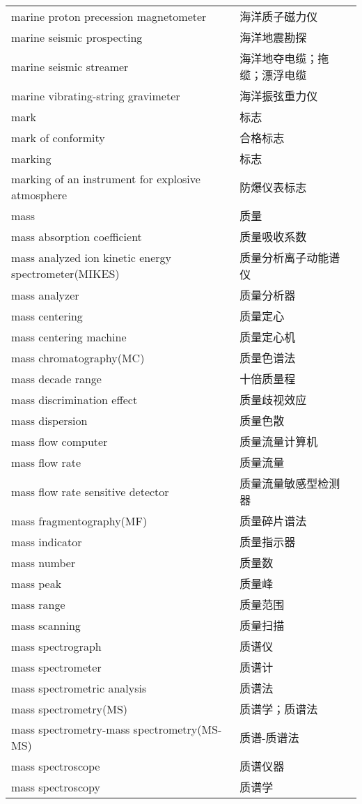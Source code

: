 \documentclass[
]{article}
\begin{document}
\begin{longtable}[]{@{}ll@{}}
marine proton precession magnetometer & 海洋质子磁力仪 \\
marine seismic prospecting & 海洋地震勘探 \\
marine seismic streamer & 海洋地夺电缆；拖缆；漂浮电缆 \\
marine vibrating-string gravimeter & 海洋振弦重力仪 \\
mark & 标志 \\
mark of conformity & 合格标志 \\
marking & 标志 \\
marking of an instrument for explosive atmosphere & 防爆仪表标志 \\
mass & 质量 \\
mass absorption coefficient & 质量吸收系数 \\
mass analyzed ion kinetic energy spectrometer(MIKES) &
质量分析离子动能谱仪 \\
mass analyzer & 质量分析器 \\
mass centering & 质量定心 \\
mass centering machine & 质量定心机 \\
mass chromatography(MC) & 质量色谱法 \\
mass decade range & 十倍质量程 \\
mass discrimination effect & 质量歧视效应 \\
mass dispersion & 质量色散 \\
mass flow computer & 质量流量计算机 \\
mass flow rate & 质量流量 \\
mass flow rate sensitive detector & 质量流量敏感型检测器 \\
mass fragmentography(MF) & 质量碎片谱法 \\
mass indicator & 质量指示器 \\
mass number & 质量数 \\
mass peak & 质量峰 \\
mass range & 质量范围 \\
mass scanning & 质量扫描 \\
mass spectrograph & 质谱仪 \\
mass spectrometer & 质谱计 \\
mass spectrometric analysis & 质谱法 \\
mass spectrometry(MS) & 质谱学；质谱法 \\
mass spectrometry-mass spectrometry(MS-MS) & 质谱-质谱法 \\
mass spectroscope & 质谱仪器 \\
mass spectroscopy & 质谱学 \\

\end{longtable}
\end{document}
